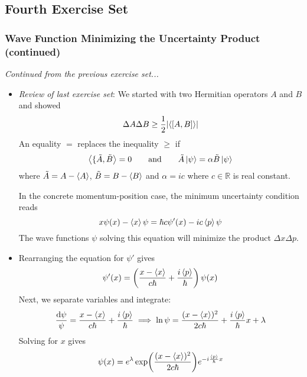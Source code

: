 \documentclass[11pt, a4paper]{article}
\newcommand{\diff}{\mathop{}\!\mathrm{d}} %
\newcommand{\eqtext}[1]{\qquad \text{#1} \qquad}
\begin{document}
\subsection{Fourth Exercise Set}

\subsubsection{Wave Function Minimizing the Uncertainty Product (continued)}
\textit{Continued from the previous exercise set...}
\begin{itemize}
	\item \textit{Review of last exercise set}: We started with two Hermitian operators $ A  $ and $ B $ and showed
	\begin{equation*}
		\Delta A \Delta B \geq \frac{1}{2}\abs{\langle [A, B] \rangle}
	\end{equation*}
	An equality $ = $ replaces the inequality $ \geq $ if
	\begin{equation*}
		\ev{\{\tilde{A}, \tilde{B}} = 0 \eqtext{and} \tilde{A}\ket{\psi} = \alpha \tilde{B}\ket{\psi}
	\end{equation*}
	where $ \tilde{A} = A - \ev{A}$, $ \tilde{B} = B - \ev{B}$ and $ \alpha = ic $ where $ c \in \mathbb{R} $ is real constant.
	
	In the concrete momentum-position case, the minimum uncertainty condition reads
	\begin{equation*}
		x \psi(x) - \expval{x} \psi = \hbar c \psi'(x) - ic \expval{p} \psi
	\end{equation*}
	The wave functions $ \psi $ solving this equation will minimize the product $ \Delta x \Delta p $. 
	
	\item Rearranging the equation for $ \psi' $ gives
	\begin{equation*}
		\psi'(x) = \left(\frac{x - \ev{x}}{c\hbar} + \frac{i\ev{p}}{\hbar}\right)\psi(x)
	\end{equation*}
	Next, we separate variables and integrate:
	\begin{equation*}
		\frac{\diff \psi}{\psi} = \frac{x - \ev{x}}{c \hbar} + \frac{i\ev{p}}{\hbar} \implies \ln \psi = \frac{(x - \ev{x})^{2}}{2c \hbar} + \frac{i\ev{p}}{\hbar}x + \lambda
	\end{equation*}
	Solving for $ x $ gives
	\begin{equation*}
		\psi(x) = e^{\lambda}\exp(\frac{(x - \ev{x})^{2}}{2c\hbar})e^{-i\frac{\ev{p}}{\hbar}x}
	\end{equation*}
	

\end{itemize}
\end{document}
